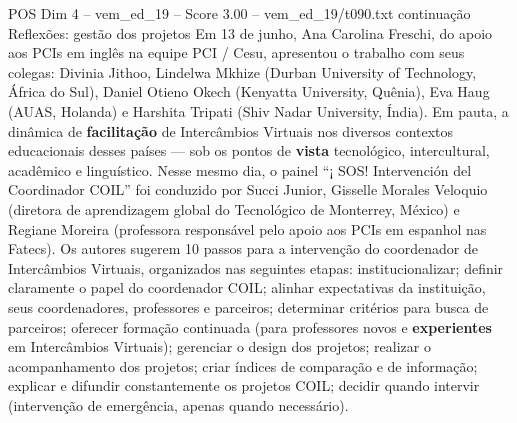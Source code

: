 \begin{textsample}{POS Dim 4 – vem\_ed\_19 – Score 3.00 – vem\_ed\_19/t090.txt}  \label{ex:f4_pos_111}
continuação Reflexões: gestão dos projetos Em 13 de junho, Ana Carolina Freschi, do apoio aos PCIs em inglês na equipe PCI / Cesu, apresentou o trabalho com seus colegas: Divinia Jithoo, Lindelwa Mkhize (Durban University of Technology, África do Sul), Daniel Otieno Okech (Kenyatta University, Quênia), Eva Haug (AUAS, Holanda) e Harshita Tripati (Shiv Nadar University, Índia).
Em pauta, a dinâmica de \textbf{facilitação} de Intercâmbios Virtuais nos diversos contextos educacionais desses países — sob os pontos de \textbf{vista} tecnológico, intercultural, acadêmico e linguístico.
Nesse mesmo dia, o painel “¡ SOS!
Intervención del Coordinador COIL” foi conduzido por Succi Junior, Gisselle Morales Veloquio (diretora de aprendizagem global do Tecnológico de Monterrey, México) e Regiane Moreira (professora responsável pelo apoio aos PCIs em espanhol nas Fatecs).
Os autores sugerem 10 passos para a intervenção do coordenador de Intercâmbios Virtuais, organizados nas seguintes etapas: institucionalizar; definir claramente o papel do coordenador COIL; alinhar expectativas da instituição, seus coordenadores, professores e parceiros; determinar critérios para busca de parceiros; oferecer formação continuada (para professores novos e \textbf{experientes} em Intercâmbios Virtuais); gerenciar o design dos projetos; realizar o acompanhamento dos projetos; criar índices de comparação e de informação; explicar e difundir constantemente os projetos COIL; decidir quando intervir (intervenção de emergência, apenas quando necessário).

\end{textsample}
